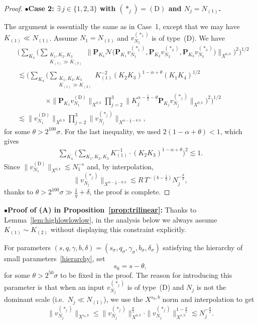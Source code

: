 \documentclass[11pt,reqno,english]{amsart}
\numberwithin{equation}{section}
\theoremstyle{plain}
\theoremstyle{definition}
\theoremstyle{remark}
\newcommand{\noi}{\noindent}
\begin{document}
\begin{proof}
	\noi
	$\bullet${\bf Case 2: $\exists\, j\in\{1,2,3\}$ with $(\ast_j)=(\mathrm{D})$ and $N_j=N_{(1)}$.}

	The argument is essentially the same as in Case~1, except that we may have $K_{(1)}\ll N_{(1)}$. Assume $N_1=N_{(1)}$ and $v_{N_1}^{(\ast_1)}$ is of type~(D). We have
	\begin{align*}
		&\Big(\sum_{K_4}\Big(\sum_{\substack{K_1,K_2,K_3\\
				K_{(1)}\gg K_{(2)}
		}} \Big\|\mathbf{P}_{K_4}\mathcal{N}
		\big(
		\mathbf{P}_{K_1}v_{N_1}^{(\ast_1)},
		\mathbf{P}_{K_2}v_{N_2}^{(\ast_2)},
		\mathbf{P}_{K_3}v_{N_3}^{(\ast_3)}
		\big)\Big\|_{X^{0,0}}\Big)^2\Big)^{1/2}\\
		&\lesssim
		\Big(\sum_{K_4}
		\Big(\sum_{\substack{K_1,K_2,K_3\\
				K_{(1)}\gg K_{(2)}
		}} K_{(1)}^{-2}(K_2 K_3)^{1-\alpha+\theta}(K_1 K_4)^{1/2}\\
		&\qquad\qquad\times
		\|\mathbf{P}_{K_1}v_{N_1}^{(\mathrm{D})}\|_{X^{0,b}}
		\prod_{j=2}^3\|K_j^{\alpha-\frac{1}{2}-\theta}\mathbf{P}_{K_j}v_{N_j}^{(\ast_j)}\|_{X^{0,b}}
		\Big)^2
		\Big)^{1/2}\\
		&\lesssim
		\|v_{N_1}^{(\mathrm{D})}\|_{X^{0,b}}\prod_{j=2}^3\|v_{N_j}^{(\ast_j)}\|_{X^{\alpha-\frac{1}{2}-\theta,b}},
	\end{align*}
	for some $\theta>2^{100}\sigma$. For the last inequality, we used $2(1-\alpha+\theta)<1$, which gives
	\begin{align*}
		\sum_{K_4}\Big(\sum_{K_1,K_2,K_3}
		K_{(1)}^{-1}\cdot (K_2 K_3)^{1-\alpha+\theta}
		\Big)^2\lesssim 1.
	\end{align*}
	Since $\|v_{N_1}^{(\mathrm{D})}\|_{X^{0,b}}\lesssim N_1^{-s}$ and, by interpolation,
	\[
	\|v_{N_j}^{(\ast_j)}\|_{X^{\alpha-\frac{1}{2}-\theta,b}}\lesssim R\, T^{-(b-\frac{1}{2})}N_j^{-\frac{\theta}{2}},
	\]
	thanks to $\theta>2^{100}\sigma\gg \frac{1}{q}+\delta$, the proof is complete.
\end{proof}


\noi
$\bullet${\bf Proof of (A) in Proposition~\ref{prop:trilinear}:} Thanks to Lemma~\ref{lem:highlowlowlow}, in the analysis below we always assume $K_{(1)}\sim K_{(2)}$ without displaying this constraint explicitly.

For parameters $(s,q,\gamma,b,\delta)=(s_{\sigma},q_{\sigma},\gamma_{\sigma},b_{\sigma},\delta_{\sigma})$ satisfying the hierarchy of small parameters~\eqref{hierarchy}, set
\[
s_0=s-\theta,
\]
for some $\theta>2^{50}\sigma$ to be fixed in the proof. The reason for introducing this parameter is that when an input $v_{N_j}^{(\ast_j)}$ is of type~(D) and $N_j$ is not the dominant scale (i.e.\ $N_j\ll N_{(1)}$), we use the $X^{s_0,b}$ norm and interpolation to get
\[
\|v_{N_j}^{(\ast_j)}\|_{X^{s_0,b}}\leq \|v_{N_j}^{(\ast_j)}\|_{X^{0,b}}^{\frac{\theta}{s}}\cdot \|v_{N_j}^{(\ast_j)}\|_{X^{s,b}}^{1-\frac{\theta}{s}}\lesssim N_j^{-\frac{\theta}{2}}.
\]
\end{document}
